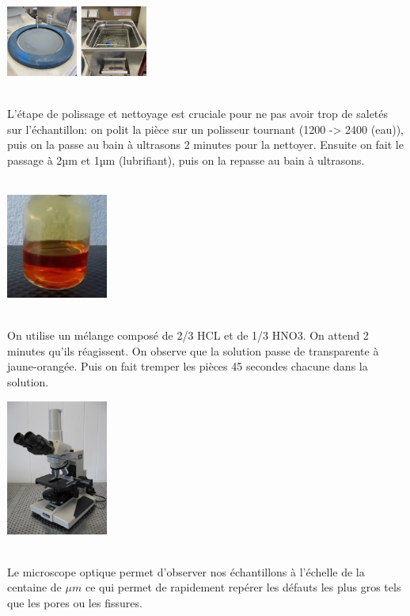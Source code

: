 \centerline{\includegraphics[width=0.35\textwidth]{images/WechatIMG1126.jpeg}}

\\
L'étape de polissage et nettoyage est cruciale pour ne pas avoir trop de saletés sur l'échantillon:
on polit la pièce sur un polisseur tournant (1200 -> 2400 (eau)), puis on la passe au bain à ultrasons 2 minutes pour la nettoyer.
Ensuite on fait le passage à 2µm et 1µm (lubrifiant),
puis on la repasse au bain à ultrasons.
\\
\\
\centerline{\includegraphics[width=0.25\textwidth]{images/WechatIMG1128.jpeg}}
\\
On utilise un mélange composé de 2/3 HCL et de 1/3 HNO3.
On attend 2 minutes qu'ils réagissent.
On observe que la solution passe de transparente à jaune-orangée.
Puis on fait tremper les pièces 45 secondes chacune dans la solution.
\\

\centerline{\includegraphics[width=0.25\textwidth]{images/optique.jpg}}
\\
Le microscope optique permet d'observer nos échantillons à l'échelle de la centaine de $\mu m$ ce qui permet de rapidement repérer les défauts les plus gros tels que les pores ou les fissures.
\\

